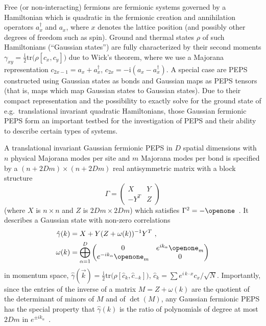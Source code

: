 \documentclass[rmp,aps,reprint,superscriptaddress,nobalancelastpage]{revtex4-1}
\begin{document}
    Free (or non-interacting) fermions are fermionic systems governed by a Hamiltonian which is quadratic in the fermionic creation and annihilation operators $a^\dagger_x$ and $a_x$, where $x$ denotes the lattice position (and possibly other degrees of freedom such as spin). Ground and thermal states $\rho$ of such Hamiltonians (``Gaussian states'') are fully characterized by their second moments $\gamma_{xy} = \tfrac{\mathrm{i}}{2}\mathrm{tr}\big(\rho [c_x,c_y]\big)$ due to Wick's theorem, where we use a  Majorana representation $c_{2x-1}=a_x+a_x^\dagger$, $c_{2x}=-\mathrm{i}(a_x-a_x^\dagger)$. A special case are PEPS constructed using Gaussian states as bonds and Gaussian maps as PEPS tensors (that is, maps which map Gaussian states to Gaussian states). Due to their compact representation and the possibility to exactly solve for the ground state of e.g.\ translational invariant quadratic Hamiltonians, those Gaussian fermionic PEPS form an important testbed for the investigation of PEPS and their ability to describe certain types of systems.

    A translational invariant Gaussian fermionic PEPS in $D$ spatial dimensions with $n$ physical Majorana modes per site and $m$ Majorana modes per bond is specified by a $(n+2Dm)\times (n+2Dm)$ real antisymmetric matrix with a block structure
    \[
        \Gamma = \begin{pmatrix}X & Y \\ -Y^T & Z \end{pmatrix}
    \]
    (where $X$ is $n\times n$ and $Z$ is $2Dm\times 2Dm$) which satisfies $\Gamma^2=-\openone$~\cite{kraus:fPEPS}.  It describes a Gaussian state with non-zero correlations
    \begin{align*}
        \hat\gamma(k) & = X+Y(Z+\omega(k))^{-1}Y^T\ ,
        \\
        \omega(k)     & = \bigoplus_{\alpha=1}^D \begin{pmatrix} 0                        &e^{ik_\alpha}\openone_m\\
                e^{-ik_\alpha}\openone_m &0\end{pmatrix}
    \end{align*}
    in momentum space, $\hat\gamma(\vec k) =
\tfrac{\mathrm i}{2}\mathrm{tr}\big(\rho[\hat c_k,\hat c_{-k}]\big)$, $\hat c_k=\sum e^{i\,k\cdot x}c_x/\sqrt{N}$.
    Importantly, since the entries of the inverse of a matrix $M=Z+\omega(k)$ are the quotient of the determinant of minors of $M$ and of $\det(M)$, any Gaussian fermionic PEPS has the special property that $\hat\gamma(k)$ is the ratio of polynomials of degree at most $2Dm$ in $e^{\pm i k_\alpha}$~\cite{schuch:GMPS}.
\end{document}
